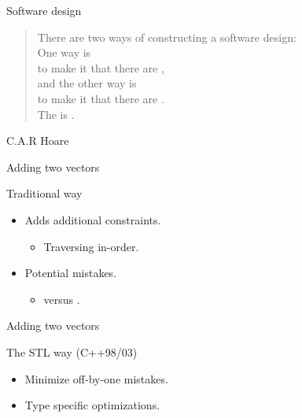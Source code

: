 \begin{frame}[t]{Software design}

\begin{quote}
There are two ways of constructing a software design:\\ 
\vspace{1em}
\pause
One way is\\
\pause
to make it  that there are ,\\
\pause
\vspace{.5em}
and the other way is\\
\pause
to make it  that there are .\\ 
\vspace{1em}
\pause
The  is . 
\end{quote}
\hfill C.A.R Hoare
\end{frame}

\begin{frame}[t,fragile]{Adding two vectors}
\begin{block}{Traditional way}

\end{block}
\pause
\begin{itemize}
  \item Adds additional constraints.
    \begin{itemize}
      \item Traversing in-order.
    \end{itemize}
  \item Potential mistakes.
    \begin{itemize}
      \item {} versus .
    \end{itemize}
\end{itemize}
\end{frame}

\begin{frame}[t,fragile]{Adding two vectors}
\begin{block}{The STL way (C++98/03)}

\end{block}
\pause
\begin{itemize}
  \item Minimize off-by-one mistakes.
  \item Type specific optimizations.
\end{itemize}
\end{frame}

